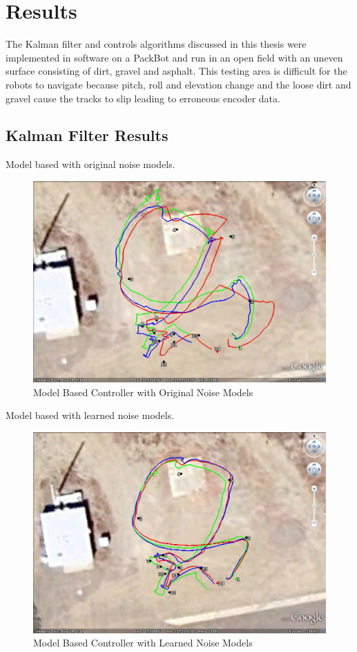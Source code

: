\chapter{Results}
\label{ch:results}
The Kalman filter and controls algorithms discussed in this thesis were implemented in software on a PackBot and run in an open field with an uneven surface consisting of dirt, gravel and asphalt. This testing area is difficult for the robots to navigate because pitch, roll and elevation change and the loose dirt and gravel cause the tracks to slip leading to erroneous encoder data.

\section{Kalman Filter Results}
\label{sec:kfResults}
Model based with original noise models.

\begin{figure}[ht!]
	\centering
	\includegraphics[width=.75\textwidth]{images/GE/20101203_1551_kf_lyapOrigQR}
	\caption{Model Based Controller with Original Noise Models}
	\label{fig:kfResults1}
\end{figure}

Model based with learned noise models.

\begin{figure}[ht!]
	\centering
	\includegraphics[width=.75\textwidth]{images/GE/20101203_1545_kf_lyapNewQR}
	\caption{Model Based Controller with Learned Noise Models}
	\label{fig:kfResults2}
\end{figure}

